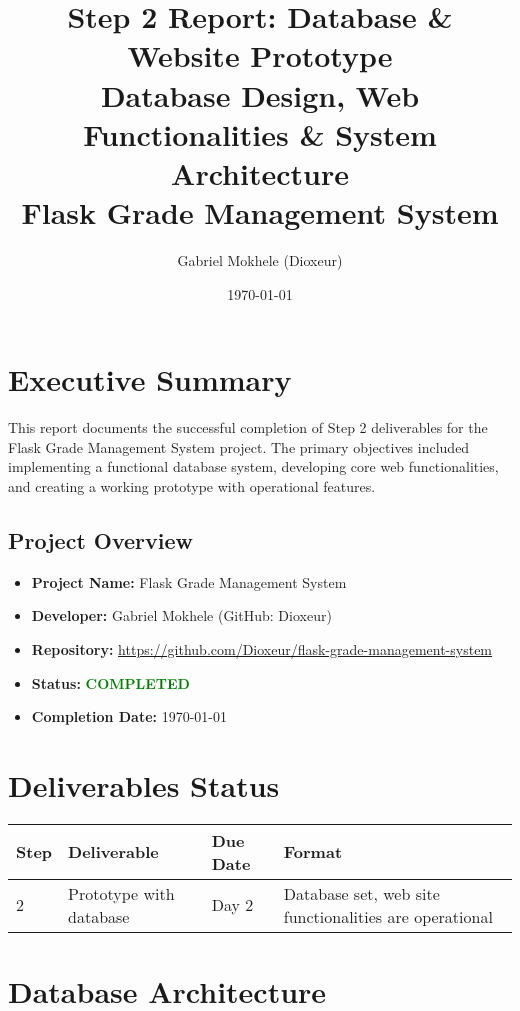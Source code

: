 \documentclass[12pt,a4paper]{article}
\title{\textbf{Step 2 Report: Database \& Website Prototype} \\ 
       \large Database Design, Web Functionalities \& System Architecture \\
       \vspace{0.5cm}
       \large Flask Grade Management System}
\author{Gabriel Mokhele (Dioxeur)}
\date{\today}
\begin{document}
\maketitle
\thispagestyle{empty}

\newpage

\tableofcontents
\newpage

\section{Executive Summary}

This report documents the successful completion of Step 2 deliverables for the Flask Grade Management System project. The primary objectives included implementing a functional database system, developing core web functionalities, and creating a working prototype with operational features.

\subsection{Project Overview}
\begin{itemize}
    \item \textbf{Project Name:} Flask Grade Management System
    \item \textbf{Developer:} Gabriel Mokhele (GitHub: Dioxeur)
    \item \textbf{Repository:} \url{https://github.com/Dioxeur/flask-grade-management-system}
    \item \textbf{Status:} \textcolor{green}{\textbf{COMPLETED}}
    \item \textbf{Completion Date:} \today
\end{itemize}

\section{Deliverables Status}

\begin{longtable}{|p{2cm}|p{4cm}|p{2cm}|p{6cm}|}
\hline
\textbf{Step} & \textbf{Deliverable} & \textbf{Due Date} & \textbf{Format} \\
\hline
\endhead
2 & Prototype with database & Day 2 & Database set, web site functionalities are operational \\
\hline
\end{longtable}

\section{Database Architecture}
\end{document}
